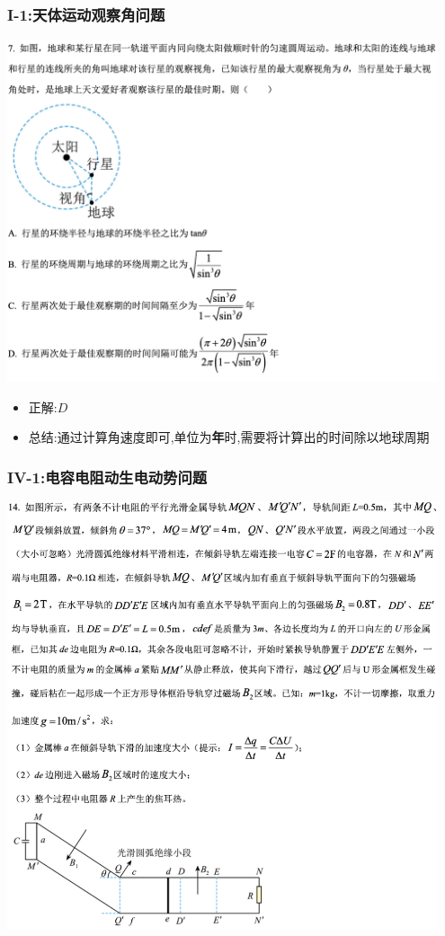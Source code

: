 \documentclass{article}
\begin{document}
\subsubsection{I-1:天体运动观察角问题}

\includegraphics[width=0.95\textwidth,keepaspectratio]{./pictures/3.10-1.png}

\begin{itemize}
    \item 正解:\quad $D$
    \item 总结:通过计算角速度即可,单位为\textbf{年}时,需要将计算出的时间除以地球周期
\end{itemize}

\vspace{2em}

\subsubsection{IV-1:电容电阻动生电动势问题}
\includegraphics[width=0.95\textwidth,keepaspectratio]{./pictures/3.10-2.png}
\end{document}
